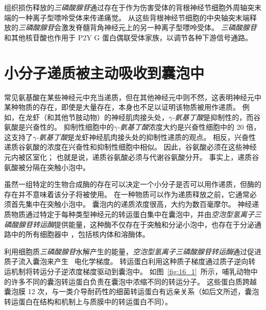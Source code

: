 组织损伤释放的\textit{三磷酸腺苷}通过存在于作为伤害受体的背根神经节细胞外周轴突末端的一种离子型嘌呤受体来传递痛觉。
从这些背根神经节细胞的中央轴突末端释放的\textit{三磷酸腺苷}会激发脊髓背角神经元上的另一种离子型嘌呤受体。
\textit{三磷酸腺苷}和其他核苷酸也作用于 P2Y G 蛋白偶联受体家族，以调节各种下游信号通路。



\section{小分子递质被主动吸收到囊泡中}

常见氨基酸在某些神经元中充当递质，但在其他神经元中则不然，这表明神经元中某种物质的存在，即使是大量存在，本身也不足以证明该物质被用作递质。
例如，在龙虾（和其他节肢动物）的神经肌肉接头处，\textit{$\gamma$-氨基丁酸}是抑制性的，而谷氨酸是兴奋性的。
抑制性细胞中的\textit{$\gamma$-氨基丁酸}浓度大约是兴奋性细胞中的 20 倍，这支持了\textit{$\gamma$-氨基丁酸}是龙虾神经肌肉接头处的抑制性递质的观点。
相反，兴奋性递质谷氨酸的浓度在兴奋性和抑制性细胞中相似。
因此，谷氨酸必须在这些神经元内被区室化；
也就是说，递质谷氨酸必须与代谢谷氨酸分开。
事实上，递质谷氨酸被分隔在突触小泡中。


虽然一组特定的生物合成酶的存在可以决定一个小分子是否可以用作递质，但酶的存在并不意味着该分子将被使用。
在一种物质可以作为递质释放之前，它通常必须首先集中在突触小泡中。
囊泡内的递质浓度很高，大约为数百毫摩尔。
神经递质物质通过特定于每种类型神经元的转运蛋白集中在囊泡中，并由\textit{空泡型氢离子三磷酸腺苷转运酶}提供能量，这种酶不仅存在于突触和分泌小泡中，也存在于分泌通路中的所有细胞器中 ，包括核内体和溶酶体。


利用细胞质\textit{三磷酸腺苷}水解产生的能量，\textit{空泡型氢离子三磷酸腺苷转运酶}通过促进质子流入囊泡来产生~ 电化学梯度。
转运蛋白利用这种质子梯度通过质子逆向转运机制将转运分子逆浓度梯度驱动到囊泡中。
如图~\ref{fig:16_1}~所示，哺乳动物中的许多不同的囊泡转运蛋白负责在囊泡中浓缩不同的转运分子。
这些蛋白质跨越囊泡膜 12 次，与一类介导耐药性的细菌转运蛋白有远亲关系（如后文所述，囊泡转运蛋白在结构和机制上与质膜中的转运蛋白不同）。



